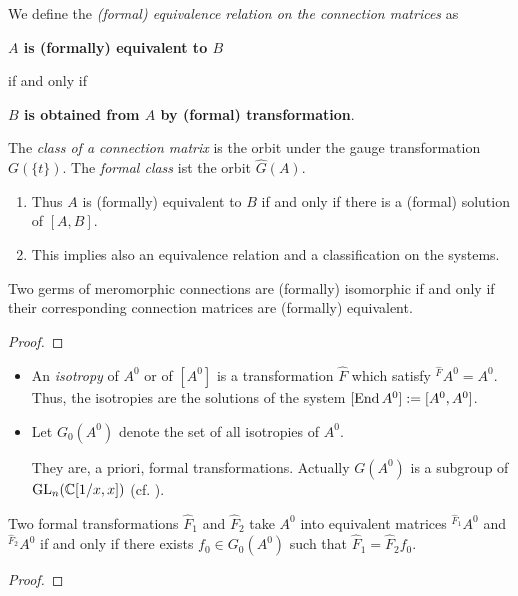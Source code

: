 \begin{defn}
  We define the \emph{(formal) equivalence relation on the connection matrices}
  as
  \begin{einr}
    \textbf{\boldmath$A$ is (formally) equivalent to $B$}
  \end{einr}
  if and only if
  \begin{einr}
    \textbf{\boldmath$B$ is obtained from $A$ by (formal) transformation}.
  \end{einr}
  The \emph{class of a connection matrix} is the orbit under the gauge
  transformation  $G(\!\{t\}\!)$. The \emph{formal class} ist the
  orbit  $\hat G(A)$.
  \begin{s-rem}
    \begin{enumerate}
      \item Thus $A$ is (formally) equivalent to $B$ if and only if there is a
        (formal) solution of $[A,B]$.
      \item This implies also an equivalence relation and a classification on
        the systems.
    \end{enumerate}
  \end{s-rem}
\end{defn}

\begin{prop}
  Two germs of meromorphic connections are (formally) isomorphic if and only if
  their corresponding connection matrices are (formally) equivalent.
\end{prop}
\begin{proof}
  \TODO{}
\end{proof}

\begin{defn}
  \begin{itemize}
    \item An \emph{isotropy} of $A^0$ or of $[A^0]$ is a transformation $\hat
      F$ which satisfy ${}^{\hat F}\!A^0=A^0$.
      Thus, the isotropies are the solutions of the system
      $[\operatorname{End} A^0]:=[A^0,A^0]$.
    \item Let $G_0(A^0)$ denote the set of all isotropies of $A^0$.
      \begin{s-rem}
        They are, a priori, formal transformations. Actually $G(A^0)$ is a
        subgroup of $\operatorname{GL}_n(\mathbb{C}[1/x,x])$ (cf. \TODO{}).
      \end{s-rem}
  \end{itemize}
\end{defn}
\begin{lem}
  Two formal transformations $\hat F_1$ and $\hat F_2$ take $A^0$ into
  equivalent matrices ${}^{\hat F_1}\!A^0$ and  ${}^{\hat F_2}\!A^0$ if and
  only if there exists $f_0\in G_0(A^0)$ such that $\hat F_1=\hat F_2f_0$.
\end{lem}
\begin{proof}
  \TODO{}
\end{proof}

